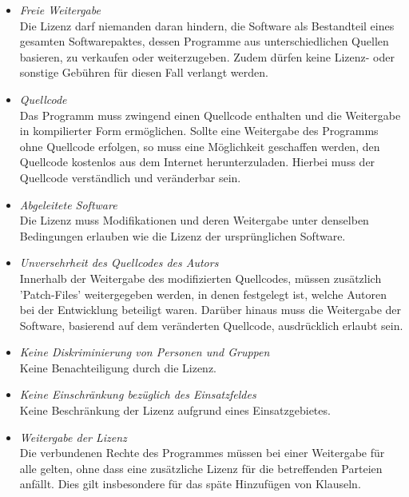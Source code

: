 \begin{itemize}
    \item \textit{Freie Weitergabe}\\
    Die Lizenz darf niemanden daran hindern, die Software als Bestandteil eines gesamten Softwarepaktes, dessen Programme aus unterschiedlichen Quellen basieren, zu verkaufen oder weiterzugeben. Zudem dürfen keine Lizenz- oder sonstige Gebühren für diesen Fall verlangt werden. 

    \item \textit{Quellcode}\\
    Das Programm muss zwingend einen Quellcode enthalten und die Weitergabe in kompilierter Form ermöglichen. Sollte eine Weitergabe des Programms ohne Quellcode erfolgen, so muss eine Möglichkeit geschaffen werden, den Quellcode kostenlos aus dem Internet herunterzuladen. Hierbei muss der Quellcode verständlich und veränderbar sein. 

    \item \textit{Abgeleitete Software}\\
    Die Lizenz muss Modifikationen und deren Weitergabe unter denselben Bedingungen erlauben wie die Lizenz der ursprünglichen Software. 

    \item \textit{Unversehrheit des Quellcodes des Autors}\\
    Innerhalb der Weitergabe des modifizierten Quellcodes, müssen zusätzlich 'Patch-Files' weitergegeben werden, in denen festgelegt ist, welche Autoren bei der Entwicklung beteiligt waren. Darüber hinaus muss die Weitergabe der Software, basierend auf dem veränderten Quellcode, ausdrücklich erlaubt sein. 

    \item \textit{Keine Diskriminierung von Personen und Gruppen}\\
    Keine Benachteiligung durch die Lizenz.
    
    \item \textit{Keine Einschränkung bezüglich des Einsatzfeldes}\\
    Keine Beschränkung der Lizenz aufgrund eines Einsatzgebietes.  

    \item \textit{Weitergabe der Lizenz}\\
    Die verbundenen Rechte des Programmes müssen bei einer Weitergabe für alle gelten, ohne dass eine zusätzliche Lizenz für die betreffenden Parteien anfällt. Dies gilt insbesondere für das späte Hinzufügen von Klauseln. 


\end{itemize}
